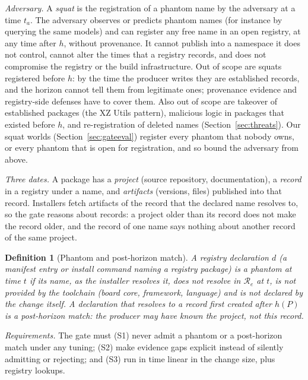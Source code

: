 \documentclass[conference]{IEEEtran}
\newcommand{\Reg}{\mathcal{R}}
\newtheorem{definition}{Definition}
\begin{document}
\emph{Adversary.} A \emph{squat} is the registration of a phantom name by the adversary at a time $t_a$. The adversary
observes or predicts phantom names (for instance by querying the same models) and can register any free name in an
open registry, at any time after $h$, without provenance. It cannot publish into a namespace it does not control,
cannot alter the times that a registry records, and does not compromise the registry or the build
infrastructure. Out of scope are squats registered before $h$: by the time the producer writes they are established
records, and the horizon cannot tell them from legitimate ones; provenance evidence and registry-side defenses have to
cover them. Also out of scope are takeover of established packages (the XZ Utils pattern), malicious logic in packages
that existed before $h$, and re-registration of deleted names (Section~\ref{sec:threats}). Our squat worlds
(Section~\ref{sec:gateeval}) register every phantom that nobody owns, or every phantom that is open for registration,
and so bound the adversary from above.

\emph{Three dates.} A package has a \emph{project} (source repository, documentation), a \emph{record} in a registry
under a name, and \emph{artifacts} (versions, files) published into that record. Installers fetch artifacts of the
record that the declared name resolves to, so the gate reasons about records: a project older than its record does not
make the record older, and the record of one name says nothing about another record of the same project.

\begin{definition}[Phantom and post-horizon match]
A registry declaration $d$ (a manifest entry or install command naming a registry package) is a
\emph{phantom} at time $t$ if its name, as the installer resolves it, does not resolve in $\Reg_e$ at $t$, is not
provided by the toolchain (board core, framework, language) and is not declared by the change itself. A declaration
that resolves to a record first created after $h(P)$ is a \emph{post-horizon match}: the producer may have known the
project, not this record.
\end{definition}

\emph{Requirements.} The gate must (S1) never admit a phantom or a post-horizon match under any tuning;
(S2) make evidence gaps explicit instead of silently admitting or rejecting; and (S3) run in time linear in the change
size, plus registry lookups.
\end{document}
